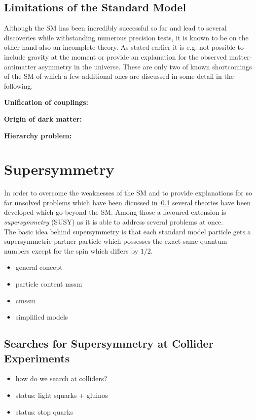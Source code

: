 \subsection{Limitations of the Standard Model}
\label{subsec:sm_shortcomings}
Although the SM has been incredibly successful so far and lead to several discoveries while withstanding numerous precision tests, it is known to be on the other hand also an incomplete theory. As stated earlier it is e.g. not possible to include gravity at the moment or provide an explanation for the observed matter-antimatter asymmetry in the universe. These are only two of known shortcomings of the SM of which a few additional ones are discussed in some detail in the following.
\begin{description}
\item \textbf{Unification of couplings:}
\item \textbf{Origin of dark matter:}
\item \textbf{Hierarchy problem:}
\end{description}

\section{Supersymmetry}
\label{sec:susy}
In order to overcome the weaknesses of the SM and to provide explanations for so far unsolved problems which have been dicussed in~\ref{subsec:sm_shortcomings} several theories have been developed which go beyond the SM. Among those a favoured extension is \textit{supersymmetry} (SUSY) as it is able to address several problems at once. \\ 
The basic idea behind supersymmetry is that each standard model particle gets a supersymmetric partner particle which possesses the exact same quantum numbers except for the spin which differs by $1/2$.
\begin{itemize}
\item general concept
\item particle content mssm
\item cmssm
\item simplified models
\end{itemize}


\subsection{Searches for Supersymmetry at Collider Experiments}
\label{subsec:susy_status}

\begin{itemize}
\item how do we search at colliders?
\item status: light squarks + gluinos
\item status: stop quarks
\end{itemize}
